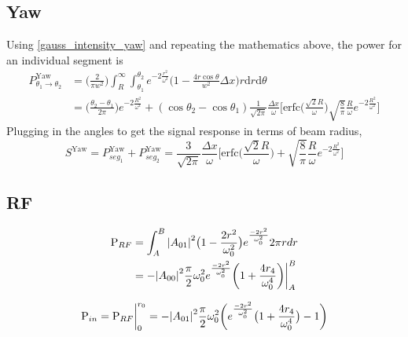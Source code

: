 \begin{appendices}
	\subsection{Yaw}
	Using \ref{gauss_intensity_yaw} and repeating the mathematics above, the power for an individual segment is
	\begin{equation}
	\begin{split}
	P^{\text{Yaw}}_{\theta_1 \rightarrow \theta_2} 	&=  \bigg(\frac{2}{\pi w^2}\bigg) \int_{R}^{\infty} \int_{\theta_1}^{\theta_2} e^{-2 \frac{r^2}{\omega^2}}  \bigg(1-\frac{4 r \cos \theta}{w^2}\Delta x\bigg) r \text{d}r \text{d} \theta\\
	&= \bigg( \frac{\theta_2-\theta_1}{2 \pi}\bigg) e^{-2 \frac{R^2}{\omega^2}} + (\cos \theta_2 - \cos \theta_1) \frac{1}{\sqrt{2 \pi}} \frac{\Delta x}{\omega} \bigg[ 	  \text{erfc} \bigg(\frac{\sqrt{2} R}{\omega}\bigg) \sqrt{\frac{8}{\pi}} \frac{R}{\omega} e^{-2 \frac{R^2}{\omega^2}}\bigg]
	\end{split}
	\end{equation}
	Plugging in the angles to get the signal response in terms of beam radius,
	\begin{equation}
	S^{\text{Yaw}} = P^{\text{Yaw}}_{seg_1} + P^{\text{Yaw}}_{seg_2} = \frac{3}{\sqrt{2\pi}} \frac{\Delta x}{\omega} \bigg[ \text{erfc} \bigg(\frac{\sqrt{2} R}{\omega}\bigg) + \sqrt{\frac{8}{\pi }} \frac{R}{\omega} e^{-2 \frac{R^2}{\omega^2}} \bigg]
	\end{equation}
	
	\subsection{RF}
	\begin{equation}
	\begin{split}
	\text{P}_{RF} &= \int_{A}^{B} \abs{A_{01}}^2 \big(1-\frac{2r^2}{\omega_{0}^2}\big) e^{\frac{-2r^2}{\omega_{0}^2}} 2\pi r dr\\
	&= -\abs{A_{00}}^2 \frac{\pi}{2} \omega_{0}^2 e^{\frac{-2r^2}{\omega_{0}^2}} \bigg(1 + \frac{4 r_4}{\omega_{0}^4} \bigg)  \biggr\rvert_A^B
	\end{split}
	\end{equation}
	
	\begin{equation}
	\text{P}_{in} \\
	= \text{P}_{RF} \biggr\rvert_0^{r_0} \\
	= - \abs{A_{01}}^2  \frac{\pi}{2} \omega_{0}^2 \bigg( e^{\frac{-2r^2}{\omega_{0}^2}} \big(1 + \frac{4 r_4}{\omega_{0}^4} \big) - 1 \bigg)
	\end{equation}
	

\end{appendices}
